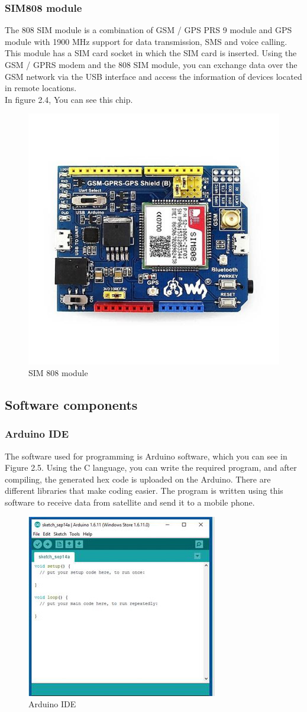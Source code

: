 \subsubsection{SIM808 module}
The 808 SIM module is a combination of GSM / GPS PRS 9 module and GPS module with 1900 MHz support for data transmission, SMS and voice calling.
This module has a SIM card socket in which the SIM card is inserted. Using the GSM / GPRS modem and the 808 SIM module, you can exchange data over the GSM network via the USB interface and access the information of devices located in remote locations.\\
In figure 2.4, You can see this chip.
\begin{figure}[!h]
	\centerline{\includegraphics[width=.5\textwidth]{sim809}}
	\caption{SIM 808 module}
\end{figure}
\subsection{Software components}
\subsubsection{Arduino IDE}
The software used for programming is Arduino software, which you can see in Figure 2.5. Using the C language, you can write the required program, and after compiling, the generated hex code is uploaded on the Arduino. There are different libraries that make coding easier. The program is written using this software to receive data from satellite and send it to a mobile phone.\\
\begin{figure}[!h]
	\centerline{\includegraphics[width=.5\textwidth]{arduino-ide}}
	\caption{Arduino IDE}
\end{figure}